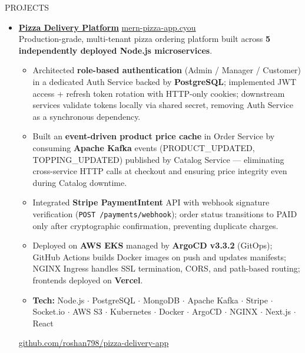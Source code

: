 \documentclass{resume}
\begin{document}
\begin{rSection}{PROJECTS}
\begin{itemize}



\item \href{https://github.com/roshan798/pizza-delivery-app}{\textbf{Pizza Delivery Platform}}
  \hfill \href{https://mern-pizza-app.cyou}{mern-pizza-app.cyou}\\
  Production-grade, multi-tenant pizza ordering platform built across
  \textbf{5 independently deployed Node.js microservices}.
  \begin{itemize}
    \itemsep -3pt
    \item Architected \textbf{role-based authentication} (Admin / Manager / Customer)
          in a dedicated Auth Service backed by \textbf{PostgreSQL};
          implemented JWT access + refresh token rotation with HTTP-only cookies;
          downstream services validate tokens locally via shared secret,
          removing Auth Service as a synchronous dependency.
    \item Built an \textbf{event-driven product price cache} in Order Service by
          consuming \textbf{Apache Kafka} events (PRODUCT\_UPDATED, TOPPING\_UPDATED)
          published by Catalog Service --- eliminating cross-service HTTP calls at
          checkout and ensuring price integrity even during Catalog downtime.
    \item Integrated \textbf{Stripe PaymentIntent} API with webhook signature
          verification (\texttt{POST /payments/webhook}); order status transitions
          to PAID only after cryptographic confirmation, preventing duplicate charges.
    \item Deployed on \textbf{AWS EKS} managed by \textbf{ArgoCD v3.3.2} (GitOps);
          GitHub Actions builds Docker images on push and updates manifests;
          NGINX Ingress handles SSL termination, CORS, and path-based routing;
          frontends deployed on \textbf{Vercel}.
    \item \textbf{Tech:} Node.js \(\cdot\) PostgreSQL \(\cdot\) MongoDB \(\cdot\)
          Apache Kafka \(\cdot\) Stripe \(\cdot\) Socket.io \(\cdot\) AWS S3 \(\cdot\)
          Kubernetes \(\cdot\) Docker \(\cdot\) ArgoCD \(\cdot\) NGINX \(\cdot\)
          Next.js \(\cdot\) React
  \end{itemize}
  \href{https://github.com/roshan798/pizza-delivery-app}{github.com/roshan798/pizza-delivery-app}


\end{itemize}
\end{rSection}
\end{document}
